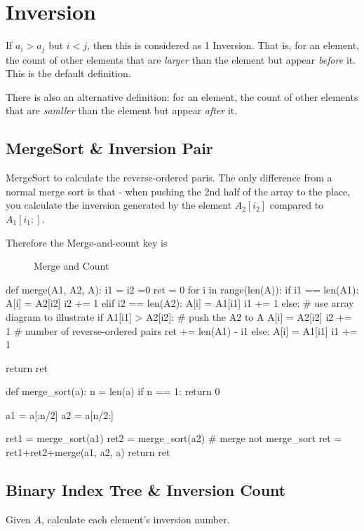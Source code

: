\section{Inversion}
If $a_i > a_j$ but $i<j$, then this is considered as 1 Inversion. That is, for an element, the count of other elements that are \textit{larger} than the element but appear \textit{before} it. This is the default definition. 

There is also an alternative definition: for an element, the count of other elements that are \textit{samller} than the element but appear \textit{after} it. 

\subsection{MergeSort \& Inversion Pair}
MergeSort to calculate the reverse-ordered paris. The only difference from a normal
merge sort is that - when pushing the 2nd half of the array to the place, you calculate
the inversion generated by the element $A_2[i_2]$ compared to $A_1[i_1:]$.

Therefore the Merge-and-count key is 

\begin{figure}[hbtp]
\centering
{}
\caption{Merge and Count}
\label{fig:mergeAndSort}
\end{figure}

\begin{python}
def merge(A1, A2, A):
  i1 = i2 =0
  ret = 0
  for i in range(len(A)):
    if i1 == len(A1):
      A[i] = A2[i2]
      i2 += 1
    elif i2 == len(A2):
      A[i] = A1[i1]
      i1 += 1
    else:
      # use array diagram to illustrate
      if A1[i1] > A2[i2]:  # push the A2 to A
        A[i] = A2[i2]
        i2 += 1
        # number of reverse-ordered pairs
        ret += len(A1) - i1
      else:
        A[i] = A1[i1]
        i1 += 1

  return ret

def merge_sort(a):
  n = len(a)
  if n == 1:
    return 0

  a1 = a[:n/2]
  a2 = a[n/2:]

  ret1 = merge_sort(a1)
  ret2 = merge_sort(a2)
  # merge not merge_sort
  ret = ret1+ret2+merge(a1, a2, a)  
  return ret
\end{python}

\subsection{Binary Index Tree \& Inversion Count}
Given $A$, calculate each element's inversion number. 

